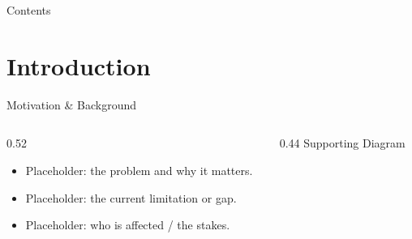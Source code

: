 

{%
  \begin{frame}
    \titlepage
  \end{frame}
}

\begin{frame}{Contents}
  \tableofcontents
\end{frame}

\section{Introduction}

\begin{frame}{Motivation \& Background}
  \begin{columns}[T]
    \begin{column}{0.52\textwidth}
      \color{coolgray}
      \begin{itemize}
        \item Placeholder: the problem and why it matters.
        \item Placeholder: the current limitation or gap.
        \item Placeholder: who is affected / the stakes.
      \end{itemize}
      \vspace{0.5em}
      \vspace{0.8em}
      \begin{minipage}[t]{0.48\textwidth}\centering
      \end{minipage}\hfill
      \begin{minipage}[t]{0.48\textwidth}\centering
      \end{minipage}
    \end{column}
    \begin{column}{0.44\textwidth}\centering
      {\footnotesize\Raleway\color{aggieblue} Supporting Diagram}\\[0.4em]
    \end{column}
  \end{columns}
\end{frame}


